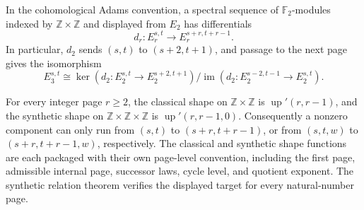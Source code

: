 \begin{definition}
  \label{def:classical-adams-e2-e3-shape-slice}
  \leanok
  In the cohomological Adams convention, a spectral sequence of
  $\mathbb F_2$-modules indexed by $\mathbb Z\times\mathbb Z$ and displayed
  from $E_2$ has differentials
  \[
    d_r:E_r^{s,t}\longrightarrow E_r^{s+r,t+r-1}.
  \]
  In particular, $d_2$ sends $(s,t)$ to $(s+2,t+1)$, and passage to the
  next page gives the isomorphism
  \[
    E_3^{s,t}\cong
      \ker(d_2:E_2^{s,t}\to E_2^{s+2,t+1})\big/
      \operatorname{im}(d_2:E_2^{s-2,t-1}\to E_2^{s,t}).
  \]
\end{definition}

\begin{definition}
  \label{def:adams-complex-shape}
  \leanok
  For every integer page $r\ge2$, the classical shape on
  $\mathbb Z\times\mathbb Z$ is $\operatorname{up}'(r,r-1)$, and the
  synthetic shape on $\mathbb Z\times\mathbb Z\times\mathbb Z$ is
  $\operatorname{up}'(r,r-1,0)$.  Consequently a nonzero component can only
  run from $(s,t)$ to $(s+r,t+r-1)$, or from $(s,t,w)$ to
  $(s+r,t+r-1,w)$, respectively.  The classical and synthetic shape functions
  are each packaged with their own page-level convention, including the first
  page, admissible internal page, successor laws, cycle level, and quotient
  exponent.  The synthetic relation theorem verifies the displayed target for
  every natural-number page.
\end{definition}

